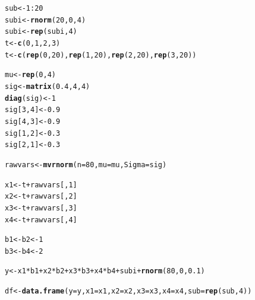 \documentclass[11pt,a4paper,twoside]{book}
\makeatletter
\newcommand{\hlnum}[1]{\textcolor[rgb]{0.686,0.059,0.569}{#1}}%
\newcommand{\hlopt}[1]{\textcolor[rgb]{0,0,0}{#1}}%
\newcommand{\hlstd}[1]{\textcolor[rgb]{0.345,0.345,0.345}{#1}}%
\newcommand{\hlkwb}[1]{\textcolor[rgb]{0.69,0.353,0.396}{#1}}%
\newcommand{\hlkwc}[1]{\textcolor[rgb]{0.333,0.667,0.333}{#1}}%
\newcommand{\hlkwd}[1]{\textcolor[rgb]{0.737,0.353,0.396}{\textbf{#1}}}%
\newenvironment{kframe}{%
 \def\at@end@of@kframe{}%
 \ifinner\ifhmode%
  \def\at@end@of@kframe{\end{minipage}}%
  \begin{minipage}{\columnwidth}%
 \fi\fi%
 \def\FrameCommand##1{\hskip\@totalleftmargin \hskip-\fboxsep
 \colorbox{shadecolor}{##1}\hskip-\fboxsep
     \hskip-\linewidth \hskip-\@totalleftmargin \hskip\columnwidth}%
 \MakeFramed {\advance\hsize-\width
   \@totalleftmargin\z@ \linewidth\hsize
   \@setminipage}}%
 {\par\unskip\endMakeFramed%
 \at@end@of@kframe}
\newenvironment{knitrout}{}{} %
\makeatother
\begin{document}
\begin{knitrout}
\color{fgcolor}\begin{kframe}
\begin{alltt}
\hlstd{sub}\hlkwb{<-} \hlnum{1}\hlopt{:}\hlnum{20}
\hlstd{subi} \hlkwb{<-} \hlkwd{rnorm}\hlstd{(}\hlnum{20}\hlstd{,} \hlnum{0}\hlstd{,} \hlnum{4}\hlstd{)}
\hlstd{subi}\hlkwb{<-}\hlkwd{rep}\hlstd{(subi,} \hlnum{4}\hlstd{)}
\hlstd{t} \hlkwb{<-} \hlkwd{c}\hlstd{(}\hlnum{0}\hlstd{,} \hlnum{1}\hlstd{,} \hlnum{2}\hlstd{,}\hlnum{3}\hlstd{)}
\hlstd{t} \hlkwb{<-} \hlkwd{c}\hlstd{(}\hlkwd{rep}\hlstd{(}\hlnum{0}\hlstd{,} \hlnum{20}\hlstd{),} \hlkwd{rep}\hlstd{(}\hlnum{1}\hlstd{,}\hlnum{20}\hlstd{),} \hlkwd{rep}\hlstd{(}\hlnum{2}\hlstd{,} \hlnum{20}\hlstd{),} \hlkwd{rep}\hlstd{(}\hlnum{3}\hlstd{,}\hlnum{20}\hlstd{))}

\hlstd{mu} \hlkwb{<-} \hlkwd{rep}\hlstd{(}\hlnum{0}\hlstd{,}\hlnum{4}\hlstd{)}
\hlstd{sig} \hlkwb{<-} \hlkwd{matrix}\hlstd{(}\hlnum{0.4}\hlstd{,} \hlnum{4}\hlstd{,} \hlnum{4}\hlstd{)}
\hlkwd{diag}\hlstd{(sig)} \hlkwb{<-} \hlnum{1}
\hlstd{sig[}\hlnum{3}\hlstd{,}\hlnum{4}\hlstd{]} \hlkwb{<-} \hlnum{0.9}
\hlstd{sig[}\hlnum{4}\hlstd{,}\hlnum{3}\hlstd{]} \hlkwb{<-} \hlnum{0.9}
\hlstd{sig[}\hlnum{1}\hlstd{,}\hlnum{2}\hlstd{]} \hlkwb{<-} \hlnum{0.3}
\hlstd{sig[}\hlnum{2}\hlstd{,}\hlnum{1}\hlstd{]} \hlkwb{<-} \hlnum{0.3}


\hlstd{rawvars} \hlkwb{<-} \hlkwd{mvrnorm}\hlstd{(}\hlkwc{n}\hlstd{=}\hlnum{80}\hlstd{,} \hlkwc{mu}\hlstd{=mu,} \hlkwc{Sigma}\hlstd{=sig)}

\hlstd{x1} \hlkwb{<-} \hlstd{t}\hlopt{+}\hlstd{rawvars[,}\hlnum{1}\hlstd{]}
\hlstd{x2} \hlkwb{<-} \hlstd{t}\hlopt{+}\hlstd{rawvars[,}\hlnum{2}\hlstd{]}
\hlstd{x3} \hlkwb{<-} \hlstd{t}\hlopt{+}\hlstd{rawvars[,}\hlnum{3}\hlstd{]}
\hlstd{x4} \hlkwb{<-} \hlstd{t}\hlopt{+}\hlstd{rawvars[,}\hlnum{4}\hlstd{]}

\hlstd{b1} \hlkwb{<-} \hlstd{b2}  \hlkwb{<-}\hlnum{1}
\hlstd{b3} \hlkwb{<-} \hlstd{b4} \hlkwb{<-} \hlnum{2}

\hlstd{y}\hlkwb{<-} \hlstd{x1}\hlopt{*}\hlstd{b1} \hlopt{+}\hlstd{x2}\hlopt{*}\hlstd{b2} \hlopt{+}\hlstd{x3}\hlopt{*}\hlstd{b3}\hlopt{+}  \hlstd{x4}\hlopt{*}\hlstd{b4} \hlopt{+} \hlstd{subi}\hlopt{+} \hlkwd{rnorm}\hlstd{(}\hlnum{80}\hlstd{,} \hlnum{0}\hlstd{,} \hlnum{0.1}\hlstd{)}

\hlstd{df} \hlkwb{<-} \hlkwd{data.frame}\hlstd{(}\hlkwc{y}\hlstd{=y,} \hlkwc{x1} \hlstd{= x1,} \hlkwc{x2}\hlstd{=x2,} \hlkwc{x3} \hlstd{= x3,} \hlkwc{x4} \hlstd{= x4,} \hlkwc{sub} \hlstd{=} \hlkwd{rep}\hlstd{(sub,}\hlnum{4}\hlstd{))}


\end{alltt}
\end{kframe}
\end{knitrout}
\end{document}
